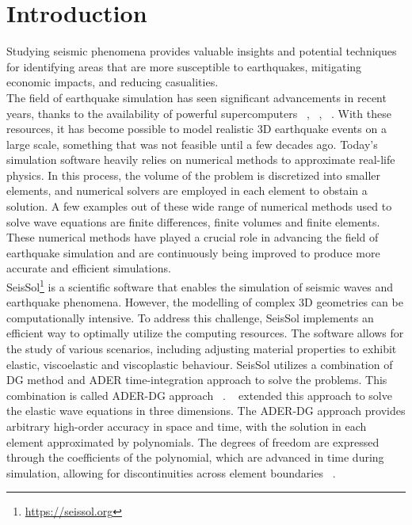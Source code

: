 
\chapter{Introduction}\label{chapter:introduction}

Studying seismic phenomena provides valuable insights and potential techniques for identifying areas that are more susceptible to earthquakes, mitigating economic impacts, 
and reducing casualities. \\

The field of earthquake simulation has seen significant advancements in recent years, thanks to the availability of powerful supercomputers ~\parencite{inproceedings}, ~\parencite{breuer}, ~\parencite{seissol}.
With these resources, it has become possible to model realistic 3D earthquake events on a large scale, something that was not feasible until a few decades ago. 
Today's simulation software heavily relies on numerical methods to approximate real-life physics. In this process, the volume of the problem is discretized into smaller elements, and numerical solvers are employed in each element to obstain a solution.
A few examples out of these wide range of numerical methods used to solve wave equations are finite differences, finite volumes and finite elements. These numerical methods have played a crucial role in advancing the field of earthquake simulation and are continuously being improved to produce more accurate and efficient simulations. \\

SeisSol\footnote{\href{https://seissol.org}{https://seissol.org}} is a scientific software that enables the simulation of seismic waves and earthquake phenomena. 
However, the modelling of complex 3D geometries can be computationally intensive. To address this challenge, SeisSol implements an efficient way to optimally utilize the computing resources. 
The software allows for the study of various scenarios, including adjusting material properties to exhibit elastic, viscoelastic and viscoplastic behaviour.
SeisSol utilizes a combination of \acf{DG} method and \acf{ADER} time-integration approach to solve the problems.
This combination is called \ac{ADER}-\ac{DG} approach ~\parencite{dumbser}. ~\parencite{dumbser1} extended this approach to solve the elastic wave equations in three dimensions. The \ac{ADER}-\ac{DG} approach provides arbitrary high-order accuracy in space and time, with the solution in each element approximated by polynomials.
The degrees of freedom are expressed through the coefficients of the polynomial, which are advanced in time during simulation, allowing for discontinuities across element boundaries ~\parencite{martin}. \\

